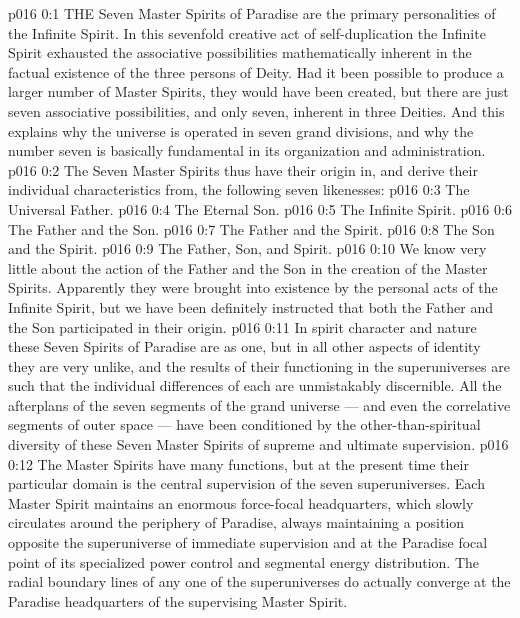\vs p016 0:1 THE Seven Master Spirits of Paradise are the primary personalities of the Infinite Spirit. In this sevenfold creative act of self\hyp{}duplication the Infinite Spirit exhausted the associative possibilities mathematically inherent in the factual existence of the three persons of Deity. Had it been possible to produce a larger number of Master Spirits, they would have been created, but there are just seven associative possibilities, and only seven, inherent in three Deities. And this explains why the universe is operated in seven grand divisions, and why the number seven is basically fundamental in its organization and administration.
\vs p016 0:2 The Seven Master Spirits thus have their origin in, and derive their individual characteristics from, the following seven likenesses:
\vs p016 0:3 \bibnobreakspace The Universal Father.
\vs p016 0:4 \bibnobreakspace The Eternal Son.
\vs p016 0:5 \bibnobreakspace The Infinite Spirit.
\vs p016 0:6 \bibnobreakspace The Father and the Son.
\vs p016 0:7 \bibnobreakspace The Father and the Spirit.
\vs p016 0:8 \bibnobreakspace The Son and the Spirit.
\vs p016 0:9 \bibnobreakspace The Father, Son, and Spirit.
\vs p016 0:10 \pc We know very little about the action of the Father and the Son in the creation of the Master Spirits. Apparently they were brought into existence by the personal acts of the Infinite Spirit, but we have been definitely instructed that both the Father and the Son participated in their origin.
\vs p016 0:11 In spirit character and nature these Seven Spirits of Paradise are as one, but in all other aspects of identity they are very unlike, and the results of their functioning in the superuniverses are such that the individual differences of each are unmistakably discernible. All the afterplans of the seven segments of the grand universe --- and even the correlative segments of outer space --- have been conditioned by the other\hyp{}than\hyp{}spiritual diversity of these Seven Master Spirits of supreme and ultimate supervision.
\vs p016 0:12 The Master Spirits have many functions, but at the present time their particular domain is the central supervision of the seven superuniverses. Each Master Spirit maintains an enormous force\hyp{}focal headquarters, which slowly circulates around the periphery of Paradise, always maintaining a position opposite the superuniverse of immediate supervision and at the Paradise focal point of its specialized power control and segmental energy distribution. The radial boundary lines of any one of the superuniverses do actually converge at the Paradise headquarters of the supervising Master Spirit.
